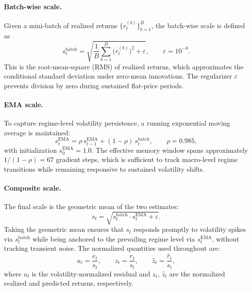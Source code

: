 \documentclass[11pt]{article}
\begin{document}
\paragraph{Batch-wise scale.}
Given a mini-batch of realized returns $\{r_t^{(b)}\}_{b=1}^{B}$,
the batch-wise scale is defined as
\begin{equation}
  s_t^{\mathrm{batch}}
  = \sqrt{\frac{1}{B}\sum_{b=1}^{B}\bigl(r_t^{(b)}\bigr)^2 + \varepsilon},
  \qquad \varepsilon = 10^{-8}.
  \label{eq:batch-scale}
\end{equation}
This is the root-mean-square (RMS) of realized returns, which
approximates the conditional standard deviation under zero-mean
innovations. The regularizer $\varepsilon$ prevents division by zero
during sustained flat-price periods.

\paragraph{EMA scale.}
To capture regime-level volatility persistence, a running exponential
moving average is maintained:
\begin{equation}
  s_t^{\mathrm{EMA}}
  = \rho\,s_{t-1}^{\mathrm{EMA}}
  + (1-\rho)\,s_t^{\mathrm{batch}},
  \qquad \rho = 0.985,
  \label{eq:ema-scale}
\end{equation}
with initialization $s_0^{\mathrm{EMA}} = 1.0$. The effective memory
window spans approximately $1/(1-\rho) = 67$ gradient steps, which
is sufficient to track macro-level regime transitions while remaining
responsive to sustained volatility shifts.

\paragraph{Composite scale.}
The final scale is the geometric mean of the two estimates:
\begin{equation}
  s_t
  = \sqrt{s_t^{\mathrm{batch}} \cdot s_t^{\mathrm{EMA}} + \varepsilon}.
  \label{eq:composite-scale}
\end{equation}
Taking the geometric mean ensures that $s_t$ responds promptly to
volatility spikes via $s_t^{\mathrm{batch}}$ while being anchored to
the prevailing regime level via $s_t^{\mathrm{EMA}}$, without
tracking transient noise. The normalized quantities used throughout
are:
\begin{equation}
  u_t = \frac{e_t}{s_t},
  \qquad
  z_t = \frac{r_t}{s_t},
  \qquad
  \hat{z}_t = \frac{\hat{r}_t}{s_t},
  \label{eq:normalized}
\end{equation}
where $u_t$ is the volatility-normalized residual and $z_t$,
$\hat{z}_t$ are the normalized realized and predicted returns,
respectively.
\end{document}
